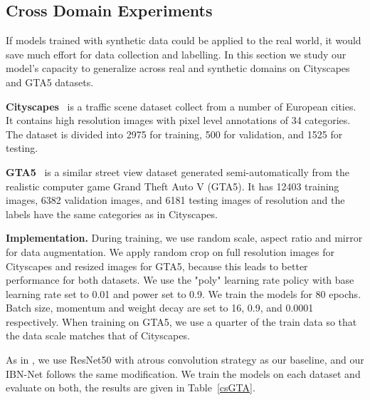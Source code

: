 \documentclass[runningheads]{llncs}
\begin{document}
\subsection{Cross Domain Experiments}

If models trained with synthetic data could be applied to the real world, it would save much effort for data collection and labelling.
In this section we study our model's capacity to generalize across real and synthetic domains on Cityscapes and GTA5 datasets.

\textbf{Cityscapes}~\cite{cordts2016cityscapes} is a traffic scene dataset collect from a number of European cities.
It contains high resolution  images with pixel level annotations of 34 categories.
The dataset is divided into 2975 for training, 500 for validation, and 1525 for testing.

\textbf{GTA5}~\cite{Richter_2016_ECCV} is a similar street view dataset generated semi-automatically from the realistic computer game Grand Theft Auto V (GTA5).
It has 12403 training images, 6382 validation images, and 6181 testing images of resolution  and the labels have the same categories as in Cityscapes.



\textbf{Implementation.} 
During training, we use random scale, aspect ratio and mirror for data augmentation.
We apply random crop on full resolution images for Cityscapes and  resized images for GTA5, because this leads to better performance for both datasets.
We use the "poly" learning rate policy with base learning rate set to 0.01 and power set to 0.9.
We train the models for 80 epochs.
Batch size, momentum and weight decay are set to 16, 0.9, and 0.0001 respectively.
When training on GTA5, we use a quarter of the train data so that the data scale matches that of Cityscapes.

As in \cite{chen2017deeplab}, we use ResNet50 with atrous convolution strategy as our baseline, and our IBN-Net follows the same modification.
We train the models on each dataset and evaluate on both, the results are given in Table~\ref{csGTA}.
\end{document}
